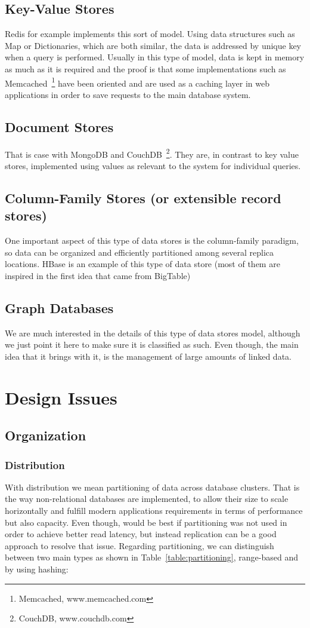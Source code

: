 	\subsection{Key-Value Stores}
	Redis for example implements this sort of model. Using data structures such as Map or Dictionaries, which are both similar, the data is addressed by unique key when a query is performed. Usually in this type of model, data is kept in memory as much as it is required and the proof is that some implementations such as Memcached~\footnote{Memcached, www.memcached.com} have been oriented and are used as a caching layer in web applications in order to save requests to the main database system.
	\subsection{Document Stores}
	That is case with MongoDB and CouchDB~\footnote{CouchDB, www.couchdb.com}. They are, in contrast to key value stores, implemented using values as relevant to the system for individual queries.
	\subsection{Column-Family Stores (or extensible record stores)}
	One important aspect of this type of data stores is the column-family paradigm, so data can be organized and efficiently partitioned among several replica locations. HBase is an example of this type of data store (most of them are inspired in the first idea that came from BigTable)
	\subsection{Graph Databases}
	We are much interested in the details of this type of data stores model, although we just point it here to make sure it is classified as such. Even though, the main idea that it brings with it, is the management of large amounts of linked data.

\section{Design Issues}
	
\subsection{Organization}
	\subsubsection{Distribution}
	With distribution we mean partitioning of data across database clusters. That is the way non-relational databases are implemented, to allow their size to scale horizontally and fulfill modern applications requirements in terms of performance but also capacity. Even though, would be best if partitioning was not used in order to achieve better read latency, but instead replication can be a good approach to resolve that issue. Regarding partitioning, we can distinguish between two main types as shown in Table~\ref{table:partitioning}, range-based and by using hashing:
	
